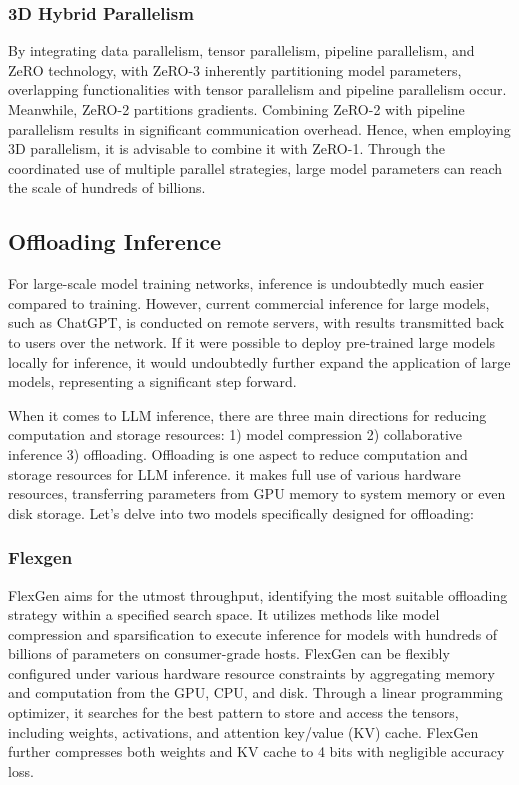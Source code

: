 \documentclass[conference]{IEEEtran}
\begin{document}
\subsubsection{3D Hybrid Parallelism}
By integrating data parallelism, tensor parallelism, pipeline parallelism, and ZeRO technology, with ZeRO-3 inherently partitioning model parameters, overlapping functionalities with tensor parallelism and pipeline parallelism occur. Meanwhile, ZeRO-2 partitions gradients. Combining ZeRO-2 with pipeline parallelism results in significant communication overhead. Hence, when employing 3D parallelism, it is advisable to combine it with ZeRO-1.
Through the coordinated use of multiple parallel strategies, large model parameters can reach the scale of hundreds of billions.

\subsection{Offloading Inference}
For large-scale model training networks, inference is undoubtedly much easier compared to training. However, current commercial inference for large models, such as ChatGPT, is conducted on remote servers, with results transmitted back to users over the network. If it were possible to deploy pre-trained large models locally for inference, it would undoubtedly further expand the application of large models, representing a significant step forward.

When it comes to LLM inference, there are three main directions for reducing computation and storage resources:
1) model compression 2) collaborative inference 3) offloading.
Offloading is one aspect to reduce computation and storage resources for LLM inference. it makes full use of various hardware resources, transferring parameters from GPU memory to system memory or even disk storage.
Let's delve into two models specifically designed for offloading:

\subsubsection{Flexgen}
FlexGen \cite{b20} aims for the utmost throughput, identifying the most suitable offloading strategy within a specified search space. It utilizes methods like model compression and sparsification to execute inference for models with hundreds of billions of parameters on consumer-grade hosts.
FlexGen can be flexibly configured under various hardware resource constraints by aggregating memory and computation from the GPU, CPU, and disk. Through a linear programming optimizer, it searches for the best pattern to store and access the tensors, including weights, activations, and attention key/value (KV) cache. FlexGen further compresses both weights and KV cache to 4 bits with negligible accuracy loss.
\end{document}
